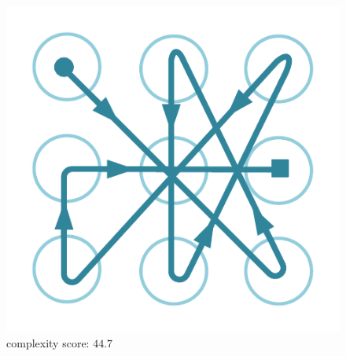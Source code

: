 \begin{figure}[!t]
{\begin{minipage}[b]{0.12\textwidth}
                \includegraphics[width=\textwidth]{fig/complex2.pdf} \\
                \centering \footnotesize complexity score: $44.7$
                \end{minipage}
            }
\end{figure}
